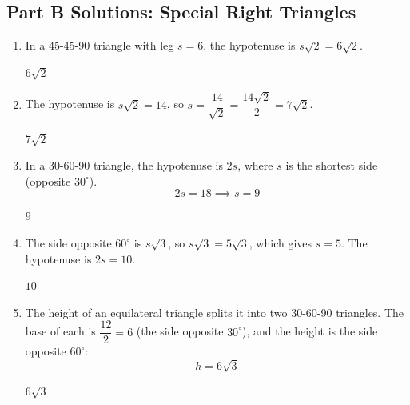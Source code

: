 \documentclass[14pt]{extarticle}
\begin{document}
\subsection*{Part B Solutions: Special Right Triangles}
\begin{enumerate}
  \item In a 45-45-90 triangle with leg \(s = 6\), the hypotenuse is \(s\sqrt{2} = 6\sqrt{2}\).

  \(\boxed{6\sqrt{2}}\)

  \item The hypotenuse is \(s\sqrt{2} = 14\), so \(s = \dfrac{14}{\sqrt{2}} = \dfrac{14\sqrt{2}}{2} = 7\sqrt{2}\).

  \(\boxed{7\sqrt{2}}\)

  \item In a 30-60-90 triangle, the hypotenuse is \(2s\), where \(s\) is the shortest side (opposite \(30^\circ\)).
  \[
  2s = 18 \implies s = 9
  \]

  \(\boxed{9}\)

  \item The side opposite \(60^\circ\) is \(s\sqrt{3}\), so \(s\sqrt{3} = 5\sqrt{3}\), which gives \(s = 5\). The hypotenuse is \(2s = 10\).

  \(\boxed{10}\)

  \item The height of an equilateral triangle splits it into two 30-60-90 triangles. The base of each is \(\dfrac{12}{2} = 6\) (the side opposite \(30^\circ\)), and the height is the side opposite \(60^\circ\):
  \[
  h = 6\sqrt{3}
  \]

  \(\boxed{6\sqrt{3}}\)
\end{enumerate}
\end{document}

